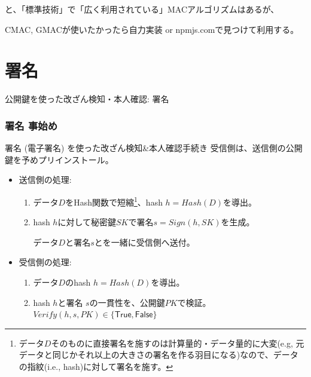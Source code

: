 \documentclass[12pt,dvipdfmx]{beamer}
\begin{document}
\begin{frame}

と、「標準技術」で「広く利用されている」MACアルゴリズムはあるが、

\vspace{2ex}

CMAC, GMACが使いたかったら自力実装 or npmjs.comで見つけて利用する。
\end{frame}

\section{署名}
\begin{frame}
\centering
{\Large 公開鍵を使った改ざん検知・本人確認: 署名}

\end{frame}

\begin{frame}
\frametitle{署名 事始め}

\begin{block}{\small 署名 (電子署名) を使った改ざん検知\&本人確認手続き}
受信側は、送信側の公開鍵を予めプリインストール。
\begin{itemize}
 \item 送信側の処理:
\begin{enumerate}
 \item データ$D$をHash関数で短縮\footnote[frame]{\scriptsize データ$D$そのものに直接署名を施すのは計算量的・データ量的に大変(e.g, 元データと同じかそれ以上の大きさの署名を作る羽目になる)なので、\alert{データの指紋(i.e., hash)に対して署名を施す}。}、hash
$h = \mathit{Hash}(D)$を導出。
 \item hash $h$に対して秘密鍵$\mathit{SK}$で署名$s = \mathit{Sign}(h, \mathit{SK})$を生成。

データ$D$と署名$s$とを一緒に受信側へ送付。
\end{enumerate}
 \item 受信側の処理:
\begin{enumerate}
 \item データ$D$のhash $h = \mathit{Hash}(D)$を導出。
 \item hash $h$と署名 $s$の一貫性を、公開鍵$\mathit{PK}$で検証。$\mathit{Verify}(h, s, \mathit{PK}) \in \{\mathsf{True}, \mathsf{False}\}$
\end{enumerate}
\end{itemize}
\end{block}
\end{frame}
\end{document}
